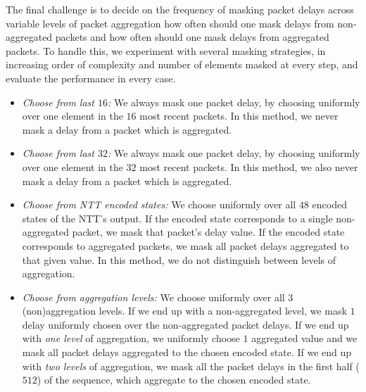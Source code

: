 The final challenge is to decide on the frequency of masking packet delays across variable levels of packet aggregation \ie how often should one mask delays from non-aggregated packets and how often should one mask delays from aggregated packets. To handle this, we experiment with several masking strategies, in increasing order of complexity and number of elements masked at every step, and evaluate the performance in every case.
\begin{itemize}
\item \emph{Choose from last $16$:} We always mask one packet delay, by choosing uniformly over one element in the $16$ most recent packets. In this method, we never mask a delay from a packet which is aggregated.
\item \emph{Choose from last $32$:} We always mask one packet delay, by choosing uniformly over one element in the $32$ most recent packets. In this method, we also never mask a delay from a packet which is aggregated.
\item \emph{Choose from NTT encoded states:} We choose uniformly over all $48$ encoded states of the NTT's output. If the encoded state corresponds to a single non-aggregated packet, we mask that packet's delay value. If the encoded state corresponds to aggregated packets, we mask all packet delays aggregated to that given value. In this method, we do not distinguish between levels of aggregation.
\item \emph{Choose from aggregation levels:} We choose uniformly over all $3$ (non)aggregation levels. If we end up with a non-aggregated level, we mask $1$ delay uniformly chosen over the non-aggregated packet delays. If we end up with \emph{one level} of aggregation, we uniformly choose $1$ aggregated value and we mask all packet delays aggregated to the chosen encoded state. If we end up with \emph{two levels} of aggregation, we mask all the packet delays in the first half ($512$) of the sequence, which aggregate to the chosen encoded state.
\end{itemize}

